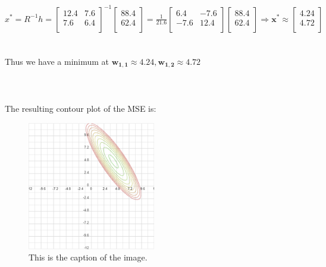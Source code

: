 \documentclass{article}
\begin{document}
\begin{enumerate}[label=\Alph*]
    $x^* = R^{-1}h = 
    \begin{bmatrix}
      12.4 & 7.6 \\
      7.6 & 6.4 \\
    \end{bmatrix}^{-1}
    \begin{bmatrix}
      88.4 \\
      62.4 \\
    \end{bmatrix} = \frac{1}{21.6}
    \begin{bmatrix}
      6.4 & -7.6 \\
      -7.6 & 12.4 \\
    \end{bmatrix}
    \begin{bmatrix}
      88.4 \\
      62.4 \\
    \end{bmatrix} \Rightarrow \bm{x^* \approx} 
    \begin{bmatrix}
      \bm{4.24} \\
      \bm{4.72} \\
    \end{bmatrix}$ \\ \\ \\Thus we have a minimum at $\bm{w_{1,1} \approx 4.24, w_{1,2} \approx 4.72}$ \\ \\ \\ \\
    The resulting contour plot of the MSE is: \\
    \begin{figure}[h]
      \centering
      \includegraphics[width=0.5\textwidth]{pr8_b.png}
      \caption{This is the caption of the image.}
    \end{figure} \\

\end{enumerate}
\end{document}
